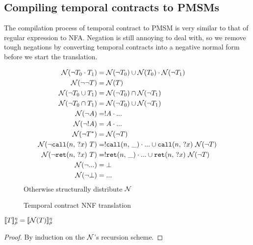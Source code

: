 \subsection{Compiling temporal contracts to PMSMs}
%
The compilation process of temporal contract to PMSM is very similar to that of regular expression to NFA.
%
Negation is still annoying to deal with, so we remove tough negations by converting temporal contracts into a negative normal form before we start the translation.
%
\begin{figure}
  \begin{align*}
    {\mathcal N}(\neg T_0 \cdot T_1) &=
      {\mathcal N}(\neg T_0) \cup {\mathcal N}(T_0) \cdot {\mathcal N}(\neg T_1)
\\
    {\mathcal N}(\neg \neg T) &= {\mathcal N}(T)
\\
    {\mathcal N}(\neg T_0 \cup T_1) &= {\mathcal N}(\neg T_0) \cap {\mathcal N}(\neg T_1)
\\
    {\mathcal N}(\neg T_0 \cap T_1) &= {\mathcal N}(\neg T_0) \cup {\mathcal N}(\neg T_1)
\\
    {\mathcal N}(\neg A) &= ! A \cdot {\tt ...}
\\
    {\mathcal N}(\neg ! A) &= A \cdot {\tt ...}
\\
    {\mathcal N}(\neg T^*) &= {\mathcal N}(\neg T)
\\
    {\mathcal N}(\neg {\tt call}(n,\, {\tt ?}x)\ T) &= ! {\tt call}(n,\, \_) \cdot {\tt ...} \cup {\tt call}(n,\, {\tt ?}x)\ {\mathcal N}(\neg T)
\\
    {\mathcal N}(\neg {\tt ret}(n,\, {\tt ?}x)\ T) &= ! {\tt ret}(n,\, \_) \cdot {\tt ...} \cup {\tt ret}(n,\, {\tt ?}x)\ {\mathcal N}(\neg T)
\\
    {\mathcal N}(\neg {\tt ...}) &= \bot
\\
    {\mathcal N}(\neg \bot) &= {\tt ...}
  \end{align*}
  Otherwise structurally distribute ${\mathcal N}$
  \caption{Temporal contract NNF translation}
  \label{fig:nnf}
\end{figure}
\begin{theorem}
  $[\![ T ]\!]^{\eta}_{\rho} = [\![ {\mathcal N}(T) ]\!]^{\eta}_{\rho}$
\end{theorem}
\begin{proof}
  By induction on the ${\mathcal N}$'s recursion scheme.
\end{proof}

